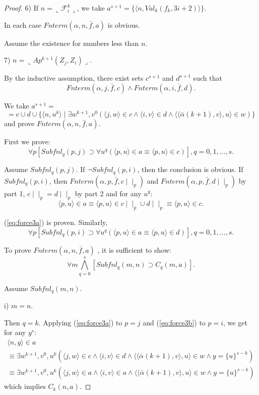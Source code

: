 \documentclass{asl}
\theoremstyle{definition}
\begin{document}
\begin{proof}
6) If $n=\llcorner \mathcal{F}_i^k\lrcorner$, we take $a^{s+1}=\lbrace \langle n,Val_k(f_k,3i+2)\rangle\rbrace$.  
\smallskip

In each case $Fnterm(\alpha,n,\bar{f},a)$ is obvious.

Assume the existence for numbers less than $n$. 

7) $n=\llcorner Ap^{k+1}(Z_j, Z_i)\lrcorner$. 

By the inductive assumption, there exist sets $c^{s+1}$ and $d^{s+1}$ such that 
\[Fnterm(\alpha,j,\bar{f},c)\wedge Fnterm(\alpha,i,\bar{f},d).\] 

We take $a^{s+1}=$
\[=c\cup d\cup\lbrace \langle n,u^{k}\rangle \mid\exists w^{k+1},v^0
\left(\langle j,w\rangle\in c\wedge 
\langle i,v\rangle\in d\wedge
\langle\langle\bar{\alpha}(k+1),v\rangle,u\rangle\in w
\right)\rbrace\] 
and prove $Fnterm(\alpha,n,\bar{f},a)$.

First we prove:
\begin{equation}
\forall p\left[Subfnl_q(p,j)\supset\forall u^q\left(
\langle p,u\rangle\in a\equiv\langle p,u\rangle\in c \right) \right],q=0,1,\ldots,s.
\label{eq:force3a}
\end{equation}

Assume $Subfnl_q(p,j)$. If $\neg Subfnl_q(p,i)$, then the conclusion is obvious. If $Subfnl_q(p,i)$, then  $Fnterm(\alpha,p,\bar{f},c\mid\mid_p)$ and $Fnterm(\alpha,p,\bar{f},d\mid\mid_p)$ by part 1, $c\mid\mid_p=d\mid\mid_p$ by part 2 and for any $u^q$:
\[\langle p,u\rangle\in a\equiv\langle p,u\rangle\in c\mid\mid_p\cup d\mid\mid_p\equiv\langle p,u\rangle\in c.\]

(\ref{eq:force3a}) is proven. Similarly,
\begin{equation}
\forall p\left[Subfnl_q(p,i)\supset\forall u^q \left(
\langle p,u\rangle\in a\equiv\langle p,u\rangle\in d \right) \right],q=0,1,\ldots,s.
\label{eq:force3b}
\end{equation}

To prove $Fnterm(\alpha,n,\bar{f},a)$ , it is sufficient to show:
\begin{equation}
\forall m \bigwedge_{q=0}^s\left[Subfnl_q(m,n)\supset C_q(m,a)\right].
\label{eq:force0}
\end{equation}

Assume $Subfnl_q(m,n)$.

i) $m=n$.

Then $q=k$. Applying (\ref{eq:force3a}) to $p=j$ and (\ref{eq:force3b}) to $p=i$, we get for any $y^s$:
\begin{multline*}
\langle n,y\rangle\in a
\\
\equiv
\exists w^{k+1}, v^0,u^{k}
\left(\langle j,w\rangle\in c\wedge 
\langle i,v\rangle\in d
\wedge
\langle\langle\bar{\alpha}(k+1),v\rangle,u\rangle\in w
\wedge y=\lbrace u\rbrace^{s-k}\right)
\\
\equiv
\exists w^{k+1}, v^0,u^{k}
\left(\langle j,w\rangle\in a\wedge 
\langle i,v\rangle\in a
\wedge
\langle\langle\bar{\alpha}(k+1),v\rangle,u\rangle\in w
\wedge y=\lbrace u\rbrace^{s-k}\right)
\end{multline*}
which implies $C_k(n,a)$.


\end{proof}
\end{document}
